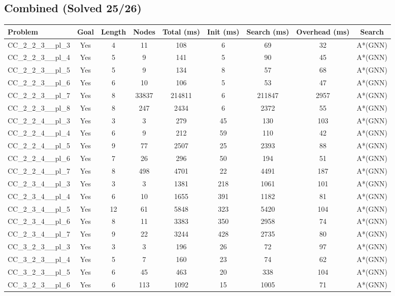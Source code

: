 \documentclass{article}
\begin{document}
\subsection*{Combined (Solved 25/26)}
\begin{tabular}{lcccccccc}
\toprule
Problem & Goal & Length & Nodes & Total (ms) & Init (ms) & Search (ms) & Overhead (ms) & Search \\
\midrule
CC\_2\_2\_3\_\_pl\_3 & Yes & 4 & 11 & 108 & 6 & 69 & 32 & A*(GNN) \\
CC\_2\_2\_3\_\_pl\_4 & Yes & 5 & 9 & 141 & 5 & 90 & 45 & A*(GNN) \\
CC\_2\_2\_3\_\_pl\_5 & Yes & 5 & 9 & 134 & 8 & 57 & 68 & A*(GNN) \\
CC\_2\_2\_3\_\_pl\_6 & Yes & 6 & 10 & 106 & 5 & 53 & 47 & A*(GNN) \\
CC\_2\_2\_3\_\_pl\_7 & Yes & 8 & 33837 & 214811 & 6 & 211847 & 2957 & A*(GNN) \\
CC\_2\_2\_3\_\_pl\_8 & Yes & 8 & 247 & 2434 & 6 & 2372 & 55 & A*(GNN) \\
CC\_2\_2\_4\_\_pl\_3 & Yes & 3 & 3 & 279 & 45 & 130 & 103 & A*(GNN) \\
CC\_2\_2\_4\_\_pl\_4 & Yes & 6 & 9 & 212 & 59 & 110 & 42 & A*(GNN) \\
CC\_2\_2\_4\_\_pl\_5 & Yes & 9 & 77 & 2507 & 25 & 2393 & 88 & A*(GNN) \\
CC\_2\_2\_4\_\_pl\_6 & Yes & 7 & 26 & 296 & 50 & 194 & 51 & A*(GNN) \\
CC\_2\_2\_4\_\_pl\_7 & Yes & 8 & 498 & 4701 & 22 & 4491 & 187 & A*(GNN) \\
CC\_2\_3\_4\_\_pl\_3 & Yes & 3 & 3 & 1381 & 218 & 1061 & 101 & A*(GNN) \\
CC\_2\_3\_4\_\_pl\_4 & Yes & 6 & 10 & 1655 & 391 & 1182 & 81 & A*(GNN) \\
CC\_2\_3\_4\_\_pl\_5 & Yes & 12 & 61 & 5848 & 323 & 5420 & 104 & A*(GNN) \\
CC\_2\_3\_4\_\_pl\_6 & Yes & 8 & 11 & 3383 & 350 & 2958 & 74 & A*(GNN) \\
CC\_2\_3\_4\_\_pl\_7 & Yes & 9 & 22 & 3244 & 428 & 2735 & 80 & A*(GNN) \\
CC\_3\_2\_3\_\_pl\_3 & Yes & 3 & 3 & 196 & 26 & 72 & 97 & A*(GNN) \\
CC\_3\_2\_3\_\_pl\_4 & Yes & 5 & 7 & 160 & 23 & 74 & 62 & A*(GNN) \\
CC\_3\_2\_3\_\_pl\_5 & Yes & 6 & 45 & 463 & 20 & 338 & 104 & A*(GNN) \\
CC\_3\_2\_3\_\_pl\_6 & Yes & 6 & 113 & 1092 & 15 & 1005 & 71 & A*(GNN) \\

\end{tabular}
\end{document}
